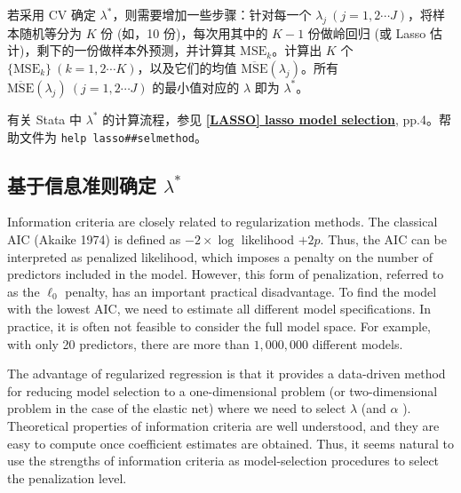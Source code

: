 若采用 CV 确定 $\lambda^*$，则需要增加一些步骤：针对每一个 $\lambda_j\ (j=1,2\cdots J)$，将样本随机等分为 $K$ 份 (如，10 份)，每次用其中的 $K-1$ 份做岭回归 (或 Lasso 估计)，剩下的一份做样本外预测，并计算其 $\mathrm{MSE}_k$。计算出 $K$ 个 $\{\mathrm{MSE}_k\}\ (k=1,2\cdots K)$，以及它们的均值 $\overline{\mathrm{MSE}}(\lambda_j)$。所有 $\overline{\mathrm{MSE}}(\lambda_j)\ (j=1,2\cdots J)$ 的最小值对应的 $\lambda$ 即为 $\lambda^*$。

有关 Stata 中 $\lambda^*$ 的计算流程，参见 \href{https://www.stata.com/manuals/lassolasso.pdf}{\bfseries{[\MakeUppercase{lasso}] lasso model selection}}, pp.4。帮助文件为 \texttt{help lasso\#\#selmethod}。



\subsection{基于信息准则确定 $\lambda^*$}\label{sec:lasso-lambda-ic}
\iffalse %
Information criteria are closely related to regularization methods. The classical AIC (Akaike 1974) is defined as $-2 \times \log$ likelihood $+2 p$. Thus, the AIC can be interpreted as penalized likelihood, which imposes a penalty on the number of predictors included in the model. However, this form of penalization, referred to as the $\ell_{0}$ penalty, has an important practical disadvantage. To find the model with the lowest AIC, we need to estimate all different model specifications. In practice, it is often not feasible to consider the full model space. For example, with only 20 predictors, there are more than $1,000,000$ different models.

The advantage of regularized regression is that it provides a data-driven method for reducing model selection to a one-dimensional problem (or two-dimensional problem in the case of the elastic net) where we need to select $\lambda$ (and $\alpha$ ). Theoretical properties of information criteria are well understood, and they are easy to compute once coefficient estimates are obtained. Thus, it seems natural to use the strengths of information criteria as model-selection procedures to select the penalization level.

